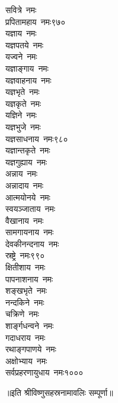 \begin{multicols}{2}
\begin{flushleft}
सवित्रे~नमः\\
प्रपितामहाय~नमः\hfill ९७०\\
यज्ञाय~नमः\\
यज्ञपतये~नमः\\
यज्वने~नमः\\
यज्ञाङ्गाय~नमः\\
यज्ञवाहनाय~नमः\\
यज्ञभृते~नमः\\
यज्ञकृते~नमः\\
यज्ञिने~नमः\\
यज्ञभुजे~नमः\\
यज्ञसाधनाय~नमः\hfill ९८०\\
यज्ञान्तकृते~नमः\\
यज्ञगुह्याय~नमः\\
अन्नाय~नमः\\
अन्नादाय~नमः\\
आत्मयोनये~नमः\\
स्वयञ्जाताय~नमः\\
वैखानाय~नमः\\
सामगायनाय~नमः\\
देवकीनन्दनाय~नमः\\
स्रष्ट्रे~नमः\hfill ९९०\\
क्षितीशाय~नमः\\
पापनाशनाय~नमः\\
शङ्खभृते~नमः\\
नन्दकिने~नमः\\
चक्रिणे~नमः\\
शार्ङ्गधन्वने~नमः\\
गदाधराय~नमः\\
रथाङ्गपाणये~नमः\\
अक्षोभ्याय~नमः\\
सर्वप्रहरणायुधाय~नमः\hfill १०००
\end{flushleft}
\end{multicols}
॥इति श्रीविष्णुसहस्रनामावलिः सम्पूर्णा॥